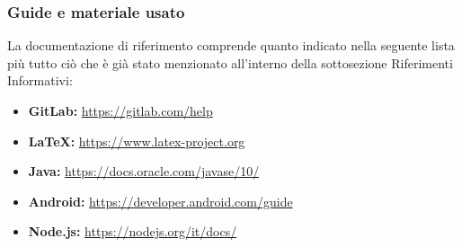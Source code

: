 \subsubsection{Guide e materiale usato}
La documentazione di riferimento comprende quanto indicato nella seguente lista più tutto ciò che è già stato menzionato all’interno della sottosezione Riferimenti Informativi:
\begin{itemize}
    \item \textbf{GitLab: }\href{https://gitlab.com/help}{https://gitlab.com/help}
    \item \textbf{LaTeX: }\href{https://www.latex-project.org}{https://www.latex-project.org}
    \item \textbf{Java: }\href{https://docs.oracle.com/javase/10/}{https://docs.oracle.com/javase/10/}
    \item \textbf{Android: }\href{https://developer.android.com/guide}{https://developer.android.com/guide}
    \item \textbf{Node.js: }\href{https://nodejs.org/it/docs/}{https://nodejs.org/it/docs/}
\end{itemize}
